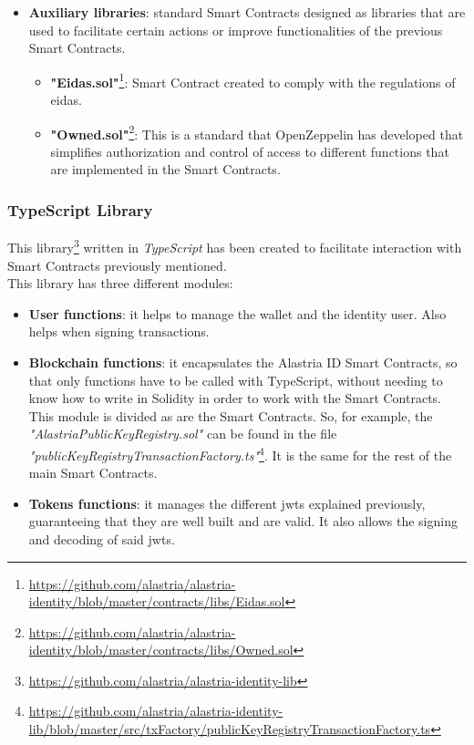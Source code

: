 \begin{itemize}
                \item \textbf{Auxiliary libraries}: standard Smart Contracts designed as libraries that are used to facilitate certain actions or improve functionalities of the previous Smart Contracts.
                \begin{itemize}
                    \item \textbf{"Eidas.sol"}\footnote{\url{https://github.com/alastria/alastria-identity/blob/master/contracts/libs/Eidas.sol}}: Smart Contract created to comply with the regulations of \acrfull{eidas}.
                    \item \textbf{"Owned.sol"}\footnote{\url{https://github.com/alastria/alastria-identity/blob/master/contracts/libs/Owned.sol}}: This is a standard that OpenZeppelin\cite{openzeppelin} has developed that simplifies authorization and control of access to different functions that are implemented in the Smart Contracts.
                \end{itemize}
            \end{itemize}
        
        \subsubsection{TypeScript Library}
            This library\footnote{\url{https://github.com/alastria/alastria-identity-lib}} written in \textit{TypeScript} has been created to facilitate interaction with Smart Contracts previously mentioned.\\
            
            This library has three different modules:
            \begin{itemize}
                \item \textbf{User functions}: it helps to manage the wallet and the identity user. Also helps when signing transactions.
                \item \textbf{Blockchain functions}: it encapsulates the Alastria ID Smart Contracts, so that only functions have to be called with TypeScript, without needing to know how to write in Solidity in order to work with the Smart Contracts. This module is divided as are the Smart Contracts. So, for example, the \textit{"AlastriaPublicKeyRegistry.sol"} can be found in the file \textit{"publicKeyRegistryTransactionFactory.ts"}\footnote{\url{https://github.com/alastria/alastria-identity-lib/blob/master/src/txFactory/publicKeyRegistryTransactionFactory.ts}}. It is the same for the rest of the main Smart Contracts.
                \item \textbf{Tokens functions}: it manages the different \acrshort{jwt}s explained previously, guaranteeing that they are well built and are valid. It also allows the signing and decoding of said \acrshort{jwt}s.
            \end{itemize}
            
